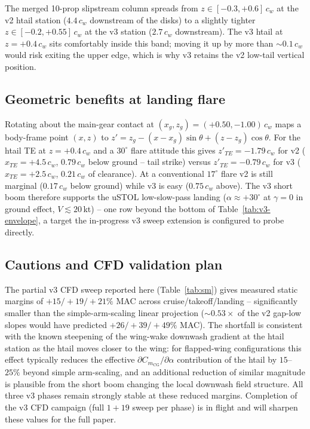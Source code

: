 \documentclass[conf]{new-aiaa}
\begin{document}
The merged 10-prop slipstream column spreads from
$z\in[-0.3,+0.6]\,c_w$ at the v2 htail station
($4.4\,c_w$ downstream of the disks) to a slightly tighter
$z\in[-0.2,+0.55]\,c_w$ at the v3 station
($2.7\,c_w$ downstream).  The v3 htail at $z=+0.4\,c_w$ sits
comfortably inside this band; moving it up by more than
$\sim 0.1\,c_w$ would risk exiting the upper edge, which is
why v3 retains the v2 low-tail vertical position.

\subsection{Geometric benefits at landing flare}

Rotating about the main-gear contact at
$(x_g,z_g)=(+0.50,-1.00)\,c_w$ maps a body-frame point
$(x,z)$ to $z'=z_g-(x-x_g)\sin\theta+(z-z_g)\cos\theta$.  For
the htail TE at $z=+0.4\,c_w$ and a $30^\circ$ flare attitude
this gives $z'_{TE}=-1.79\,c_w$ for v2 ($x_{TE}=+4.5\,c_w$,
$0.79\,c_w$ below ground -- tail strike) versus
$z'_{TE}=-0.79\,c_w$ for v3 ($x_{TE}=+2.5\,c_w$,
$0.21\,c_w$ of clearance).  At a conventional $17^\circ$
flare v2 is still marginal ($0.17\,c_w$ below ground) while
v3 is easy ($0.75\,c_w$ above).  The v3 short boom therefore
supports the uSTOL low-slow-pass landing
($\alpha\approx +30^\circ$ at $\gamma=0$ in ground effect,
$V\lesssim 20\,$kt) -- one row beyond the bottom of
Table~\ref{tab:v3-envelope}, a target the in-progress v3
sweep extension is configured to probe directly.

\subsection{Cautions and CFD validation plan}

The partial v3 CFD sweep reported here (Table~\ref{tab:sm})
gives measured static margins of $+15/+19/+21\%$ MAC across
cruise/takeoff/landing -- significantly smaller than the
simple-arm-scaling linear projection ($\sim 0.53\times$ of the
v2 gap-low slopes would have predicted $+26/+39/+49\%$ MAC).
The shortfall is consistent with the known steepening of the
wing-wake downwash gradient at the htail station as the htail
moves closer to the wing: for flapped-wing configurations this
effect typically reduces the effective
$\partial C_{m_{\mathrm{CG}}}/\partial\alpha$ contribution of
the htail by $15$--$25\%$ beyond simple arm-scaling, and an
additional reduction of similar magnitude is plausible from the
short boom changing the local downwash field structure.  All
three v3 phases remain strongly stable at these reduced margins.
Completion of the v3 CFD campaign (full $1+19$ sweep per phase)
is in flight and will sharpen these values for the full paper.
\end{document}
